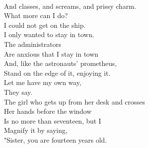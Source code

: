 \documentclass[smalldemyvopaper,11pt,twoside,onecolumn,openright,extrafontsizes]{memoir}
\begin{document}
\\And classes, and screams, and prissy charm.
\\What more can I do?
\\I could not get on the ship.
\\I only wanted to stay in town.
\\The administrators
\\Are anxious that I stay in town
\\And, like the astronauts' prometheus,
\\Stand on the edge of it, enjoying it.
\\Let me have my own way,
\\They say.
\\The girl who gets up from her desk and crosses
\\Her hands before the window
\\Is no more than seventeen, but I
\\Magnify it by saying,
\\"Sister, you are fourteen years old.
\end{document}
